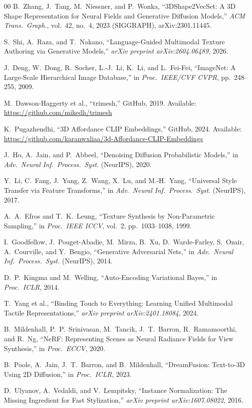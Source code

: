 \documentclass[conference]{IEEEtran}
\begin{document}
\begin{thebibliography}{00}
B.~Zhang, J.~Tang, M.~Niessner, and P.~Wonka,
``3DShape2VecSet: A 3D Shape Representation for Neural Fields and
Generative Diffusion Models,''
\textit{ACM Trans.\ Graph.}, vol.~42, no.~4, 2023 (SIGGRAPH),
arXiv:2301.11445.

S.~Shi, A.~Raza, and T.~Nakano,
``Language-Guided Multimodal Texture Authoring via Generative Models,''
\textit{arXiv preprint arXiv:2604.06489}, 2026.

J.~Deng, W.~Dong, R.~Socher, L.-J.~Li, K.~Li, and L.~Fei-Fei,
``ImageNet: A Large-Scale Hierarchical Image Database,''
in \textit{Proc.\ IEEE/CVF CVPR}, pp.~248--255, 2009.

M.~Dawson-Haggerty et al.,
``trimesh,'' GitHub, 2019.
Available: \url{https://github.com/mikedh/trimesh}

K.~Pugazhendhi,
``3D Affordance CLIP Embeddings,''
GitHub, 2024.
Available: \url{https://github.com/karanwxliaa/3d-Affordance-CLIP-Embeddings}

J.~Ho, A.~Jain, and P.~Abbeel,
``Denoising Diffusion Probabilistic Models,''
in \textit{Adv.\ Neural Inf.\ Process.\ Syst.} (NeurIPS), 2020.

Y.~Li, C.~Fang, J.~Yang, Z.~Wang, X.~Lu, and M.-H.~Yang,
``Universal Style Transfer via Feature Transforms,''
in \textit{Adv.\ Neural Inf.\ Process.\ Syst.} (NeurIPS), 2017.

A.~A.~Efros and T.~K.~Leung,
``Texture Synthesis by Non-Parametric Sampling,''
in \textit{Proc.\ IEEE ICCV}, vol.~2, pp.~1033--1038, 1999.

I.~Goodfellow, J.~Pouget-Abadie, M.~Mirza, B.~Xu, D.~Warde-Farley,
S.~Ozair, A.~Courville, and Y.~Bengio,
``Generative Adversarial Nets,''
in \textit{Adv.\ Neural Inf.\ Process.\ Syst.} (NeurIPS), 2014.

D.~P.~Kingma and M.~Welling,
``Auto-Encoding Variational Bayes,''
in \textit{Proc.\ ICLR}, 2014.

T.~Yang et al.,
``Binding Touch to Everything: Learning Unified Multimodal Tactile
Representations,''
\textit{arXiv preprint arXiv:2401.18084}, 2024.

B.~Mildenhall, P.~P.~Srinivasan, M.~Tancik, J.~T.~Barron, R.~Ramamoorthi,
and R.~Ng,
``NeRF: Representing Scenes as Neural Radiance Fields for View Synthesis,''
in \textit{Proc.\ ECCV}, 2020.

B.~Poole, A.~Jain, J.~T.~Barron, and B.~Mildenhall,
``DreamFusion: Text-to-3D Using 2D Diffusion,''
in \textit{Proc.\ ICLR}, 2023.

D.~Ulyanov, A.~Vedaldi, and V.~Lempitsky,
``Instance Normalization: The Missing Ingredient for Fast Stylization,''
\textit{arXiv preprint arXiv:1607.08022}, 2016.

\end{thebibliography}
\end{document}
